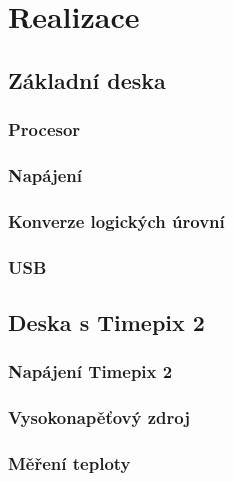 \chapter{Realizace}


\section{Základní deska}
	\subsection{Procesor}
	\subsection{Napájení}
	\subsection{Konverze logických úrovní}	
	\subsection{USB}
	
\section{Deska s Timepix 2}
	\subsection{Napájení Timepix 2}
	\subsection{Vysokonapěťový zdroj}
	\subsection{Měření teploty}
	